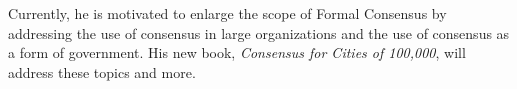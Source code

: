 Currently, he is motivated to enlarge the scope of Formal Consensus by addressing the use of consensus in large organizations and the use of consensus as a form of government. His new book, \emph{Consensus for Cities of 100,000}, will address these topics and more. 


\begin{figure}[h]
\begin{center}
\label{fig:ctpicture}
\end{center}
\end{figure}